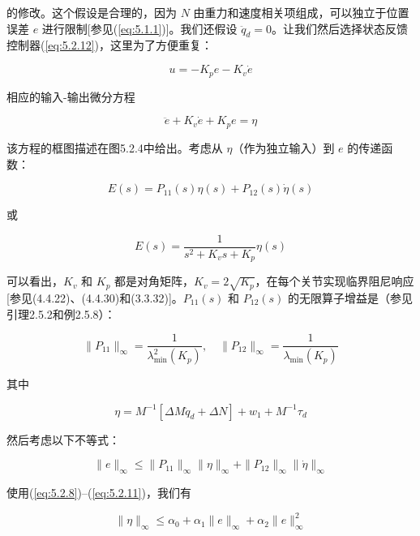 \documentclass[UTF8,12pt,a4paper]{ctexart}
\begin{document}
的修改。这个假设是合理的，因为 $N$ 由重力和速度相关项组成，可以独立于位置误差 $e$ 进行限制[参见(\ref{eq:5.1.1})]。我们还假设 $\ddot{q}_d = 0$。让我们然后选择状态反馈控制器(\ref{eq:5.2.12})，这里为了方便重复：

\begin{equation}\label{eq:5.2.21}
u = -K_p e - K_v \dot{e}
\end{equation}

相应的输入-输出微分方程

\begin{equation}\label{eq:5.2.22}
\ddot{e} + K_v \dot{e} + K_p e = \eta
\end{equation}

该方程的框图描述在图5.2.4中给出。考虑从 $\eta$（作为独立输入）到 $e$ 的传递函数：

\begin{equation}\label{eq:5.2.23}
E(s) = P_{11}(s)\eta(s) + P_{12}(s)\dot{\eta}(s)
\end{equation}

或

\begin{equation}\label{eq:5.2.24}
E(s) = \frac{1}{s^2 + K_v s + K_p}\eta(s)
\end{equation}

可以看出，$K_v$ 和 $K_p$ 都是对角矩阵，$K_v = 2\sqrt{K_p}$，在每个关节实现临界阻尼响应[参见(4.4.22)、(4.4.30)和(3.3.32)]。$P_{11}(s)$ 和 $P_{12}(s)$ 的无限算子增益是（参见引理2.5.2和例2.5.8）：

\begin{equation}\label{eq:5.2.25}
\|P_{11}\|_\infty = \frac{1}{\lambda_{\min}^2(K_p)}, \quad \|P_{12}\|_\infty = \frac{1}{\lambda_{\min}(K_p)}
\end{equation}

其中

\begin{equation}\label{eq:5.2.26}
\eta = M^{-1}[\Delta M \ddot{q}_d + \Delta N] + w_1 + M^{-1}\tau_d
\end{equation}

然后考虑以下不等式：

\begin{equation}
\|e\|_\infty \leq \|P_{11}\|_\infty\|\eta\|_\infty + \|P_{12}\|_\infty\|\dot{\eta}\|_\infty
\end{equation}

使用(\ref{eq:5.2.8})--(\ref{eq:5.2.11})，我们有

\begin{equation}\label{eq:5.2.27}
\|\eta\|_\infty \leq \alpha_0 + \alpha_1\|e\|_\infty + \alpha_2\|e\|_\infty^2
\end{equation}
\end{document}
